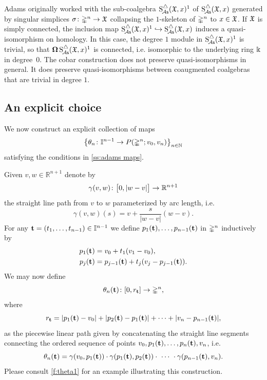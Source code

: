 \begin{remark}
	Adams originally worked with the sub-coalgebra $\sSchainsA(\fX,x)^1$ of $\sSchainsA(\fX,x)$ generated by singular simplices $\sigma \colon \gsimplex^n \to \fX$ collapsing the $1$-skeleton of $\gsimplex^n$ to $x \in \fX$.
	If $\fX$ is simply connected, the inclusion map $\sSchainsA(\fX,x)^1 \hookrightarrow \sSchainsA(\fX,x)$ induces a quasi-isomorphism on homology.
	In this case, the degree $1$ module in $\sSchainsA(\fX,x)^1$ is trivial, so that $\cobar \sSchainsA(\fX,x)^1$ is connected, i.e.
	isomorphic to the underlying ring $\k$ in degree~$0$.
	The cobar construction does not preserve quasi-isomorphisms in general.
	It does preserve quasi-isomorphisms between coaugmented coalgebras that are trivial in degree $1$.
\end{remark}

\subsection{An explicit choice}\label{explicitchoice}

We now construct an explicit collection of maps
\[
\set[\big]{\theta_n \colon \gcube^{n-1} \to P(\gsimplex^n;v_0,v_n)}_{n\in\N}
\]
satisfying the conditions in \cref{ss:adams maps}.

Given $v,w \in \mathbb{R}^{n+1}$ denote by
\[
\gamma(v,w) \colon \big[0, \bars{w-v}\big] \to \mathbb{R}^{n+1}
\]
the straight line path from $v$ to $w$ parameterized by arc length, i.e.
\[
\gamma(v,w)(s) = v + \frac{s}{|w-v|}(w-v).
\]
For any $\bft=(t_1, \dots, t_{n-1}) \in \gcube^{n-1}$ we define $p_1(\bft), \dots, p_{n-1}(\bft)$ in $\gsimplex^n$ inductively by
\[
\begin{split}
	p_1(\bft) &= v_0+ t_1(v_1-v_0), \\
	p_j(\bft) &= p_{j-1}(\bft) + t_j(v_j-p_{j-1}(\bft)).
\end{split}
\]
We may now define
\[
\theta_n(\bft) \colon [0, r_{\bft}] \to \gsimplex^n,
\]
where
\[
r_{\bft} = \bars{p_1(\bft)-v_0} + \bars{p_2(\bft)-p_1(\bft)} + \dots + \bars{v_n-p_{n-1}(\bft)},
\]
as the piecewise linear path given by concatenating the straight line segments connecting the ordered sequence of points $v_0, p_1(\bft), \dots, p_n(\bft), v_n$, i.e.
\[
\theta_n(\bft) =
\gamma(v_0,p_1(\bft)) \cdot \gamma(p_1(\bft), p_2(\bft)) \cdot\ \dotsb\ \cdot \gamma(p_{n-1}(\bft),v_n).
\]
Please consult \cref{f:theta1} for an example illustrating this construction.

